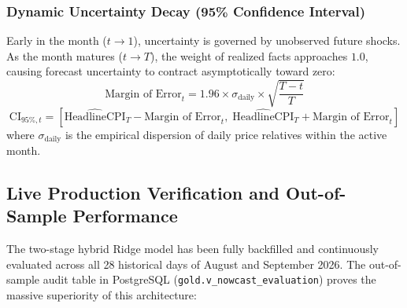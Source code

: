 \documentclass[11pt,a4paper,oneside]{article}
\begin{document}
\subsubsection{Dynamic Uncertainty Decay (95\% Confidence Interval)}
Early in the month ($t \to 1$), uncertainty is governed by unobserved future shocks. As the month matures ($t \to T$), the weight of realized facts approaches $1.0$, causing forecast uncertainty to contract asymptotically toward zero:
\begin{equation}
\text{Margin of Error}_t = 1.96 \times \sigma_{\text{daily}} \times \sqrt{\frac{T - t}{T}}
\end{equation}
\begin{equation}
\text{CI}_{95\%, t} = \left[ \widehat{\text{HeadlineCPI}}_T - \text{Margin of Error}_t, \; \widehat{\text{HeadlineCPI}}_T + \text{Margin of Error}_t \right]
\end{equation}
where $\sigma_{\text{daily}}$ is the empirical dispersion of daily price relatives within the active month.

\subsection{Live Production Verification and Out-of-Sample Performance}
The two-stage hybrid Ridge model has been fully backfilled and continuously evaluated across all 28 historical days of August and September 2026. The out-of-sample audit table in PostgreSQL (\texttt{gold.v\_nowcast\_evaluation}) proves the massive superiority of this architecture:
\end{document}
